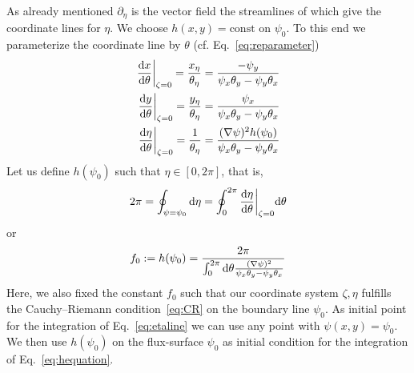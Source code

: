 As already mentioned $\partial_\eta$ is the vector field the streamlines of which give the 
coordinate lines for $\eta$. We choose $h(x,y) = \text{const}$ on $\psi_0$. To this end
we parameterize the coordinate line by $\theta$ (cf. Eq.~\eqref{eq:reparameter})
\begin{subequations}
\begin{align}
  \left . \frac{\mathrm{d} x}{\mathrm{d} \theta}\right|_{\zeta=0}=\frac{x_\eta}{\theta_\eta} = \frac{-\psi_y}{\psi_x\theta_y - \psi_y \theta_x}\\
  \left . \frac{\mathrm{d} y}{\mathrm{d} \theta}\right|_{\zeta=0}=\frac{y_\eta}{\theta_\eta} = \frac{\psi_x}{\psi_x\theta_y - \psi_y \theta_x}\\
  \left . \frac{\mathrm{d} \eta}{\mathrm{d} \theta}\right|_{\zeta=0}=\frac{1}{\theta_\eta} = \frac{(\nabla\psi)^2h(\psi_0)}{\psi_x\theta_y - \psi_y \theta_x}
\end{align}
  \label{eq:etaline}
\end{subequations}
Let us define $h(\psi_0)$ such that $\eta \in [0,2\pi]$, that is,
\[ 2\pi = \oint_{\psi=\psi_0}\mathrm{d} \eta = \oint_0^{2\pi} \frac{\mathrm{d} \eta}{\mathrm{d}\theta}\bigg|_{\zeta=0}\mathrm{d} \theta \nonumber \]
  or 
\begin{align}
  f_0 := h(\psi_0) = \frac{2\pi}{\int_0^{2\pi}\mathrm{d}\theta \frac{(\nabla\psi)^2}{\psi_x\theta_y - \psi_y \theta_x}}
  \label{eq:definef}
\end{align}
Here, we also fixed the constant $f_0$ such that our coordinate system $\zeta, \eta$ fulfills the Cauchy--Riemann condition~\eqref{eq:CR} on the boundary line $\psi_0$. 
As initial point for the integration of Eq.~\eqref{eq:etaline} we can use any point with $\psi(x,y) = \psi_0$.
We then use $h(\psi_0)$ on the flux-surface $\psi_0$ as initial condition for the integration 
of Eq.~\eqref{eq:hequation}.

